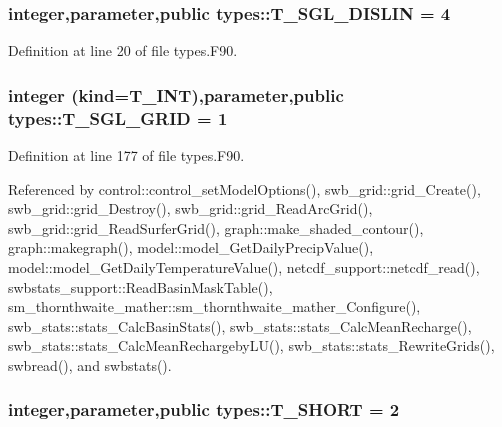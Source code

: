 \hypertarget{namespacetypes_a878c8056dbab71b170f5f7c4c9dd2235}{
\subsubsection[{T\_\-SGL\_\-DISLIN}]{\setlength{\rightskip}{0pt plus 5cm}integer,parameter,public {\bf types::T\_\-SGL\_\-DISLIN} = 4}}
\label{namespacetypes_a878c8056dbab71b170f5f7c4c9dd2235}


Definition at line 20 of file types.F90.

\hypertarget{namespacetypes_a328c49f52da66eddb0a59f71ea4235a3}{
\subsubsection[{T\_\-SGL\_\-GRID}]{\setlength{\rightskip}{0pt plus 5cm}integer (kind={\bf T\_\-INT}),parameter,public {\bf types::T\_\-SGL\_\-GRID} = 1}}
\label{namespacetypes_a328c49f52da66eddb0a59f71ea4235a3}


Definition at line 177 of file types.F90.



Referenced by control::control\_\-setModelOptions(), swb\_\-grid::grid\_\-Create(), swb\_\-grid::grid\_\-Destroy(), swb\_\-grid::grid\_\-ReadArcGrid(), swb\_\-grid::grid\_\-ReadSurferGrid(), graph::make\_\-shaded\_\-contour(), graph::makegraph(), model::model\_\-GetDailyPrecipValue(), model::model\_\-GetDailyTemperatureValue(), netcdf\_\-support::netcdf\_\-read(), swbstats\_\-support::ReadBasinMaskTable(), sm\_\-thornthwaite\_\-mather::sm\_\-thornthwaite\_\-mather\_\-Configure(), swb\_\-stats::stats\_\-CalcBasinStats(), swb\_\-stats::stats\_\-CalcMeanRecharge(), swb\_\-stats::stats\_\-CalcMeanRechargebyLU(), swb\_\-stats::stats\_\-RewriteGrids(), swbread(), and swbstats().

\hypertarget{namespacetypes_af6b9654915a854564cb3f5ded061addc}{
\subsubsection[{T\_\-SHORT}]{\setlength{\rightskip}{0pt plus 5cm}integer,parameter,public {\bf types::T\_\-SHORT} = 2}}
\label{namespacetypes_af6b9654915a854564cb3f5ded061addc}


